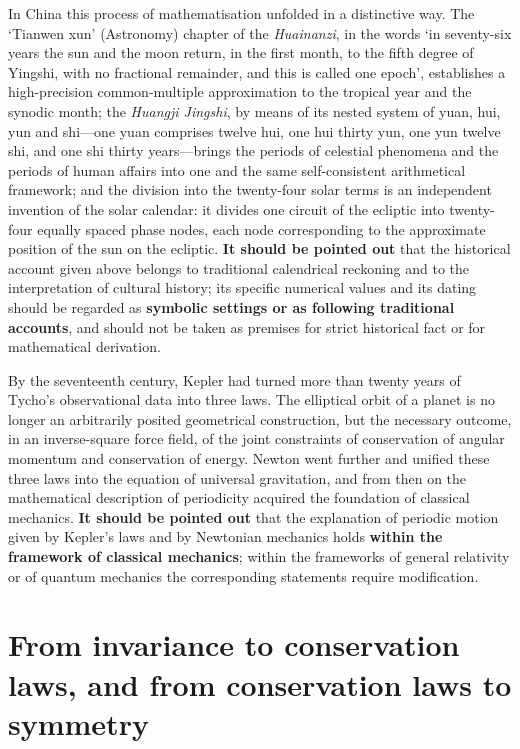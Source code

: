 In China this process of mathematisation unfolded in a distinctive way. The `Tianwen xun' (Astronomy) chapter of the \textit{Huainanzi}, in the words `in seventy-six years the sun and the moon return, in the first month, to the fifth degree of Yingshi, with no fractional remainder, and this is called one epoch', establishes a high-precision common-multiple approximation to the tropical year and the synodic month; the \textit{Huangji Jingshi}, by means of its nested system of yuan, hui, yun and shi---one yuan comprises twelve hui, one hui thirty yun, one yun twelve shi, and one shi thirty years---brings the periods of celestial phenomena and the periods of human affairs into one and the same self-consistent arithmetical framework; and the division into the twenty-four solar terms is an independent invention of the solar calendar: it divides one circuit of the ecliptic into twenty-four equally spaced phase nodes, each node corresponding to the approximate position of the sun on the ecliptic. \textbf{It should be pointed out} that the historical account given above belongs to traditional calendrical reckoning and to the interpretation of cultural history; its specific numerical values and its dating should be regarded as \textbf{symbolic settings or as following traditional accounts}, and should not be taken as premises for strict historical fact or for mathematical derivation.

By the seventeenth century, Kepler had turned more than twenty years of Tycho's observational data into three laws. The elliptical orbit of a planet is no longer an arbitrarily posited geometrical construction, but the necessary outcome, in an inverse-square force field, of the joint constraints of conservation of angular momentum and conservation of energy. Newton went further and unified these three laws into the equation of universal gravitation, and from then on the mathematical description of periodicity acquired the foundation of classical mechanics. \textbf{It should be pointed out} that the explanation of periodic motion given by Kepler's laws and by Newtonian mechanics holds \textbf{within the framework of classical mechanics}; within the frameworks of general relativity or of quantum mechanics the corresponding statements require modification.

\section*{From invariance to conservation laws, and from conservation laws to symmetry}

